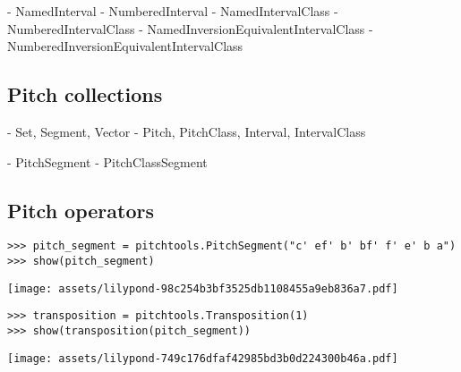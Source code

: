 \begin{markdown}
- NamedInterval
- NumberedInterval
- NamedIntervalClass
- NumberedIntervalClass
- NamedInversionEquivalentIntervalClass
- NumberedInversionEquivalentIntervalClass
\end{markdown}

\subsection{Pitch collections}

\begin{markdown}
- Set, Segment, Vector
- Pitch, PitchClass, Interval, IntervalClass
\end{markdown}

\begin{markdown}
- PitchSegment
- PitchClassSegment
\end{markdown}

\subsection{Pitch operators}

\begin{comment}
<abjad>
pitch_segment = pitchtools.PitchSegment("c' ef' b' bf' f' e' b a")
show(pitch_segment)
</abjad>
\end{comment}

\begin{singlespacing}
\vspace{-0.5\baselineskip}
\begin{lstlisting}
>>> pitch_segment = pitchtools.PitchSegment("c' ef' b' bf' f' e' b a")
>>> show(pitch_segment)
\end{lstlisting}
\noindent\texttt{[image: assets/lilypond-98c254b3bf3525db1108455a9eb836a7.pdf]}
\end{singlespacing}

\begin{comment}
<abjad>
transposition = pitchtools.Transposition(1)
show(transposition(pitch_segment))
</abjad>
\end{comment}

\begin{singlespacing}
\vspace{-0.5\baselineskip}
\begin{lstlisting}
>>> transposition = pitchtools.Transposition(1)
>>> show(transposition(pitch_segment))
\end{lstlisting}
\noindent\texttt{[image: assets/lilypond-749c176dfaf42985bd3b0d224300b46a.pdf]}
\end{singlespacing}


